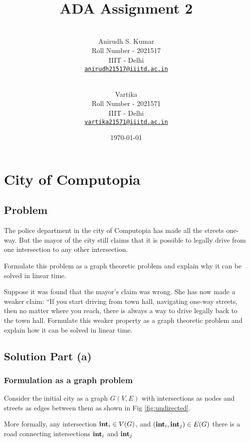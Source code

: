 \documentclass[12pt]{article}
\title{ADA Assignment 2}
\author{
    \\\vspace{0em} Anirudh S. Kumar \\\vspace{-0.5em}
    \footnotesize{Roll Number - 2021517}\\\vspace{-0.5em}
    \footnotesize{IIIT - Delhi}\\\vspace{-0.5em}
    \footnotesize{\href{mailto:anirudh21517@iiitd.ac.in}{\texttt{anirudh21517@iiitd.ac.in}}}
  \and
    \\\vspace{0em} Vartika\\\vspace{-0.5em}
    \footnotesize{Roll Number - 2021571}\\\vspace{-0.5em}
    \footnotesize{IIIT - Delhi}\\\vspace{-0.5em}
    \footnotesize{\href{mailto:vartika21571@iiitd.ac.in}{\texttt{vartika21571@iiitd.ac.in}}}
    \vspace{1em}
}
\date{\today}
\newenvironment{statement}{\color[rgb]{1.00,0.00,0.50} {}}{}
\begin{document}
\maketitle

\pagestyle{fancy}
\fancyhf{}
\fancyfoot[C]{\thepage}

\section{City of Computopia}
\subsection{Problem}
\begin{statement}
    The police department in the city of Computopia has made all the streets one-way.
But the mayor of the city still claims that it is possible to legally drive from one intersection to any
other intersection.

\begin{alphalist}
    \item Formulate this problem as a graph theoretic problem and explain why it can be solved in linear time.

    \item Suppose it was found that the mayor’s claim was wrong. She has now made a weaker claim: “If
you start driving from town hall, navigating one-way streets, then no matter where you reach,
there is always a way to drive legally back to the town hall. Formulate this weaker property as
a graph theoretic problem and explain how it can be solved in linear time.
\end{alphalist}
\end{statement}


\subsection{Solution Part \textbf{(a)}}



\subsubsection{Formulation as a graph problem}
Consider the initial city as a graph $G(V, E)$ with intersections as nodes and streets as edges between them as shown in Fig \ref{fig:undirected}.

More formally, any intersection ${\textrm{\textbf{int}}}_i \in V(G)$, and $({\textrm{\textbf{int}}}_i, {\textrm{\textbf{int}}}_j) \in E(G)$ there is a road connecting intersections ${\textrm{\textbf{int}}}_i$ and ${\textrm{\textbf{int}}}_j$
\end{document}
